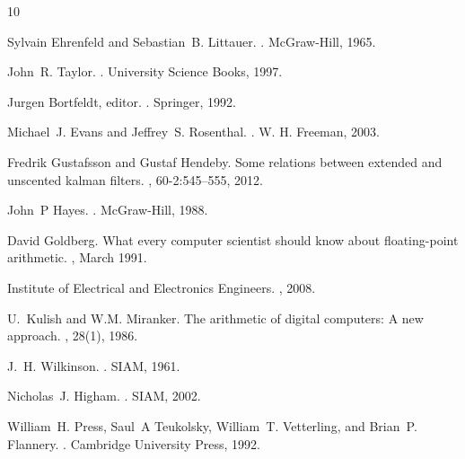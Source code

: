 \documentclass[twoside]{article}
\numberwithin{equation}{section}
\begin{document}
\begin{thebibliography}{10}

Sylvain Ehrenfeld and Sebastian~B. Littauer.
.
\newblock McGraw-Hill, 1965.

John~R. Taylor.
.
\newblock University Science Books, 1997.

Jurgen Bortfeldt, editor.
.
\newblock Springer, 1992.

Michael~J. Evans and Jeffrey~S. Rosenthal.
.
\newblock W. H. Freeman, 2003.

Fredrik Gustafsson and Gustaf Hendeby.
\newblock Some relations between extended and unscented kalman filters.
, 60-2:545--555, 2012.

John~P Hayes.
.
\newblock McGraw-Hill, 1988.

David Goldberg.
\newblock What every computer scientist should know about floating-point
  arithmetic.
, March 1991.

Institute of Electrical and Electronics Engineers.
, 2008.

U.~Kulish and W.M. Miranker.
\newblock The arithmetic of digital computers: A new approach.
, 28(1), 1986.

J.~H. Wilkinson.
.
\newblock SIAM, 1961.

Nicholas~J. Higham.
.
\newblock SIAM, 2002.

William~H. Press, Saul~A Teukolsky, William~T. Vetterling, and Brian~P.
  Flannery.
.
\newblock Cambridge University Press, 1992.


\end{thebibliography}
\end{document}
